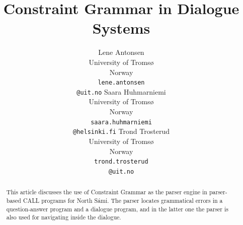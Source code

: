 \documentclass[11pt]{article}
\begin{document}
\title{Constraint Grammar in Dialogue Systems}

\author{Lene Antonsen\\
  University of Tromsø\\
  Norway\\
  {\tt lene.antonsen}\\{\tt @uit.no}  \And
  Saara Huhmarniemi\\
  University of Tromsø\\
  Norway\\
  {\tt saara.huhmarniemi}\\{\tt @helsinki.fi}  \And
  Trond Trosterud\\
  University of Tromsø\\
  Norway\\
  {\tt trond.trosterud}\\{\tt @uit.no}}



\maketitle
{}


 
\maketitle

\begin{abstract}
This article discusses the use of Constraint Grammar as the parser engine in parser-based CALL programs for North Sámi. The parser locates grammatical errors in a question-answer program and a dialogue program, and in the latter one the parser is also used for navigating inside the dialogue.

\end{abstract}
\end{document}
